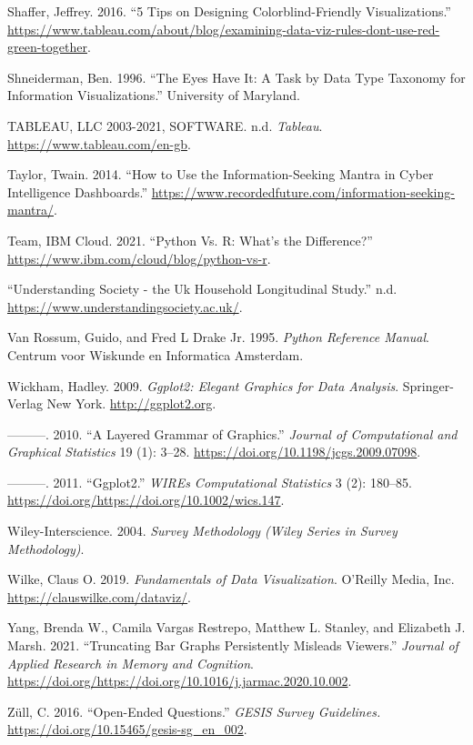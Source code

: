 \documentclass[
  11pt,
]{book}
\begin{document}
\leavevmode\hypertarget{ref-colourb}{}%
Shaffer, Jeffrey. 2016. ``5 Tips on Designing Colorblind-Friendly
Visualizations.''
\url{https://www.tableau.com/about/blog/examining-data-viz-rules-dont-use-red-green-together}.

\leavevmode\hypertarget{ref-taxonomy}{}%
Shneiderman, Ben. 1996. ``The Eyes Have It: A Task by Data Type Taxonomy
for Information Visualizations.'' University of Maryland.

\leavevmode\hypertarget{ref-tableau}{}%
TABLEAU, LLC 2003-2021, SOFTWARE. n.d. \emph{Tableau}.
\url{https://www.tableau.com/en-gb}.

\leavevmode\hypertarget{ref-taylor2014}{}%
Taylor, Twain. 2014. ``How to Use the Information-Seeking Mantra in
Cyber Intelligence Dashboards.''
\url{https://www.recordedfuture.com/information-seeking-mantra/}.

\leavevmode\hypertarget{ref-rvpy}{}%
Team, IBM Cloud. 2021. ``Python Vs. R: What's the Difference?''
\url{https://www.ibm.com/cloud/blog/python-vs-r}.

\leavevmode\hypertarget{ref-longitudinal}{}%
``Understanding Society - the Uk Household Longitudinal Study.'' n.d.
\url{https://www.understandingsociety.ac.uk/}.

\leavevmode\hypertarget{ref-py}{}%
Van Rossum, Guido, and Fred L Drake Jr. 1995. \emph{Python Reference
Manual}. Centrum voor Wiskunde en Informatica Amsterdam.

\leavevmode\hypertarget{ref-ggplot}{}%
Wickham, Hadley. 2009. \emph{Ggplot2: Elegant Graphics for Data
Analysis}. Springer-Verlag New York. \url{http://ggplot2.org}.

\leavevmode\hypertarget{ref-layered-grammar}{}%
---------. 2010. ``A Layered Grammar of Graphics.'' \emph{Journal of
Computational and Graphical Statistics} 19 (1): 3--28.
\url{https://doi.org/10.1198/jcgs.2009.07098}.

\leavevmode\hypertarget{ref-ggplot2}{}%
---------. 2011. ``Ggplot2.'' \emph{WIREs Computational Statistics} 3
(2): 180--85. \url{https://doi.org/https://doi.org/10.1002/wics.147}.

\leavevmode\hypertarget{ref-wiley2004}{}%
Wiley-Interscience. 2004. \emph{Survey Methodology (Wiley Series in
Survey Methodology)}.

\leavevmode\hypertarget{ref-wilke2019}{}%
Wilke, Claus O. 2019. \emph{Fundamentals of Data Visualization}.
O'Reilly Media, Inc. \url{https://clauswilke.com/dataviz/}.

\leavevmode\hypertarget{ref-YANG2021}{}%
Yang, Brenda W., Camila Vargas Restrepo, Matthew L. Stanley, and
Elizabeth J. Marsh. 2021. ``Truncating Bar Graphs Persistently Misleads
Viewers.'' \emph{Journal of Applied Research in Memory and Cognition}.
\url{https://doi.org/https://doi.org/10.1016/j.jarmac.2020.10.002}.

\leavevmode\hypertarget{ref-leibniz}{}%
Züll, C. 2016. ``Open-Ended Questions.'' \emph{GESIS Survey Guidelines.}
\url{https://doi.org/10.15465/gesis-sg_en_002}.

\backmatter
\end{document}
